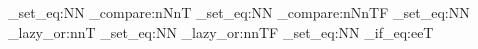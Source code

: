 \makeatletter
\ExplSyntaxOn
\cs_set_eq:NN \DimComparenNnT \dim_compare:nNnT
\cs_set_eq:NN \DimComparenNnTF \dim_compare:nNnTF
\cs_set_eq:NN \BoolLazyOrnnT \bool_lazy_or:nnT
\cs_set_eq:NN \BoolLazyOrnnTF \bool_lazy_or:nnTF
\cs_set_eq:NN \TLIfEqeeT \tl_if_eq:eeT

\def\ColorCodeBase{Maroon}
\def\ColorCodeColback{\ColorCodeBase!5}
\def\ColorCodeColbacktitle{\ColorCodeBase!5}
\def\ColorCodeTitle{\ColorCodeBase!70!black}
\def\ColorCodeBorderline{\ColorCodeBase}
\def\ColorCodeLineNumber{\ColorCodeBase}
\def\ColorCodeLineNumberBackground{\ColorCodeBase!20}

